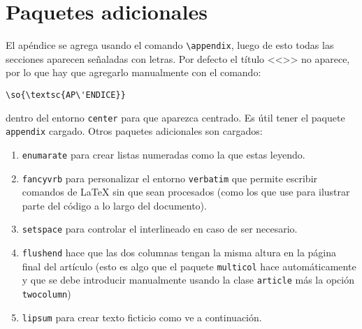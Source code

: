 \documentclass[a4paper,10pt,twocolumn,twoside]{article}
\begin{document}
\appendix
\vspace{1ex}
\begin{center}
\end{center} 

\section{Paquetes adicionales}
El apéndice se agrega usando el comando \verb+\appendix+, luego de esto todas las secciones aparecen señaladas con letras. Por defecto el título <<>> no aparece, por lo que hay que agregarlo manualmente con el comando:
\begin{Verbatim}[fontsize=\fontsize{7pt}{7pt}\selectfont]
\so{\textsc{AP\'ENDICE}}
\end{Verbatim}
dentro del entorno \texttt{center} para que aparezca centrado. Es útil tener el paquete \texttt{appendix} cargado. Otros paquetes adicionales son cargados:
\begin{enumerate}
    \item \texttt{enumarate} para crear listas numeradas como la que estas leyendo.
    \item \texttt{fancyvrb} para personalizar el entorno \texttt{verbatim} que permite escribir comandos de \LaTeX{} sin que sean procesados (como los que use para ilustrar parte del código a lo largo del documento).
    \item \texttt{setspace} para controlar el interlineado en caso de ser necesario.
    \item \texttt{flushend} hace que las dos columnas tengan la misma altura en la página final del artículo (esto es algo que el paquete \texttt{multicol} hace automáticamente y que se debe introducir manualmente usando la clase \texttt{article} más la opción \texttt{twocolumn})
    \item \texttt{lipsum} para crear texto ficticio como ve a continuación.
\end{enumerate}

\lipsum[1-4]



\end{document}
